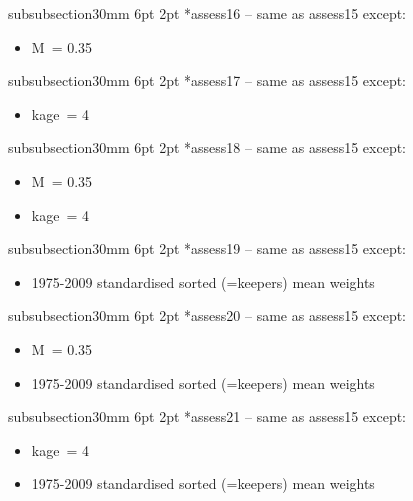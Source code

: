 \documentclass[11pt]{book}
\makeatletter
\renewcommand{\subsubsection}{\@startsection%
{subsubsection}{3}{0mm}%
{6pt \@plus -0pt \@minus -0pt}{2pt \@plus 0pt}%
{\normalfont\bf}}%
\makeatother
\begin{document}
\subsubsection*{assess16 -- same as assess15 except:}
\begin{itemize}[nosep]
  \item M~= 0.35
\end{itemize}

\subsubsection*{assess17 -- same as assess15 except:}
\begin{itemize}[nosep]
  \item kage~= 4
\end{itemize}

\subsubsection*{assess18 -- same as assess15 except:}
\begin{itemize}[nosep]
  \item M~= 0.35
  \item kage~= 4
\end{itemize}

\subsubsection*{assess19 -- same as assess15 except:}
\begin{itemize}[nosep]
  \item 1975-2009 standardised sorted (=keepers) mean weights
\end{itemize}

\subsubsection*{assess20 -- same as assess15 except:}
\begin{itemize}[nosep]
  \item M~= 0.35
  \item 1975-2009 standardised sorted (=keepers) mean weights
\end{itemize}

\subsubsection*{assess21 -- same as assess15 except:}
\begin{itemize}[nosep]
  \item kage~= 4
  \item 1975-2009 standardised sorted (=keepers) mean weights
\end{itemize}
\end{document}
